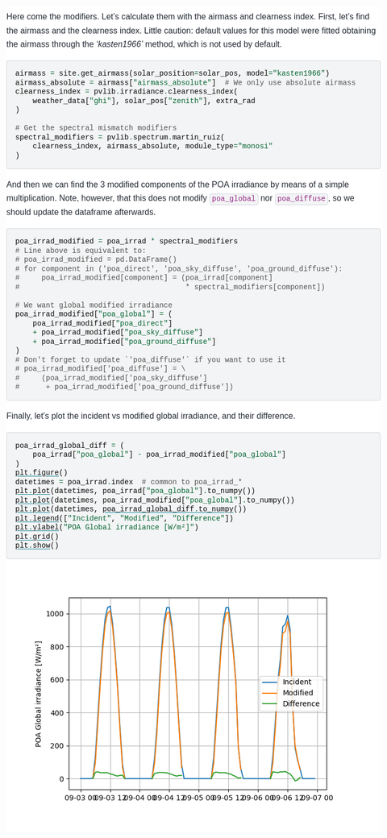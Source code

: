 \begin{myparindent}{0pt}
\includegraphics[width=\linewidth,height=0.9\textheight,keepaspectratio]{images/docs_examples_cut/mr_1.png}


\end{myparindent}
